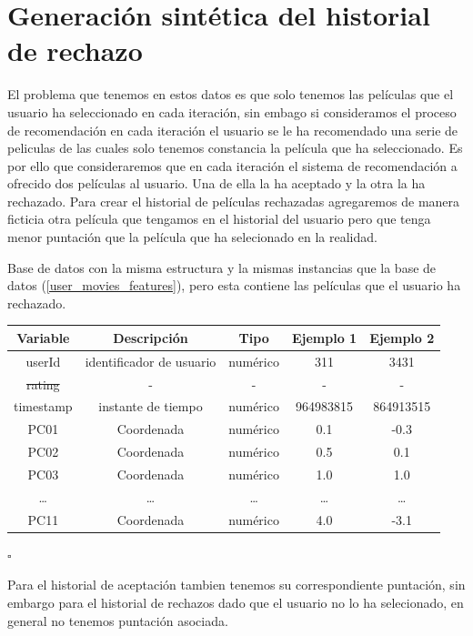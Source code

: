 \section{Generación sintética del historial de rechazo}

El problema que tenemos en estos datos es que solo tenemos las películas que el usuario ha seleccionado en cada iteración, sin embago si consideramos el proceso de recomendación en cada iteración el usuario se le ha recomendado una serie de peliculas de las cuales solo tenemos constancia la película que ha seleccionado. Es por ello que consideraremos que en cada iteración el sistema de recomendación a ofrecido dos películas al usuario. Una de ella la ha aceptado y la otra la ha rechazado. Para crear el historial de películas rechazadas agregaremos de manera ficticia otra película que tengamos en el historial del usuario pero que tenga menor puntación que la película que ha selecionado en la realidad. 

\begin{db}\label{user_movies_features_reject}
    Base de datos con la misma estructura y la mismas instancias que la base de datos (\ref{user_movies_features}), pero esta contiene las películas que el usuario ha rechazado.
    \begin{center}
        \begin{tabular}{|c|c|c|c|c|}
        \hline
        \textbf{Variable} & \textbf{Descripción} & \textbf{Tipo} & \textbf{Ejemplo 1} & \textbf{Ejemplo 2} \\ 
        \hline
            userId & identificador de usuario   & numérico & 311 & 3431 \\  
        \hline
            \st{rating} & -  & - & - & - \\
        \hline
        timestamp & instante de tiempo  & numérico & 964983815 & 864913515 \\        
        \hline
        PC01  & Coordenada & numérico &  0.1 &  -0.3      \\
        PC02  & Coordenada & numérico &  0.5 &  0.1     \\
        PC03  & Coordenada & numérico &  1.0 &  1.0      \\
        \dots & \dots                     &  \dots &  \dots &  \dots    \\        PC11  & Coordenada & numérico &  4.0 &  -3.1      \\
            \hline
        \end{tabular}
    \end{center}
    \hfill $\square$
\end{db}
\begin{obs}
    Para el historial de aceptación tambien tenemos su correspondiente puntación, sin embargo para el historial de rechazos dado que el usuario no lo ha selecionado, en general no tenemos puntación asociada.
\end{obs}


